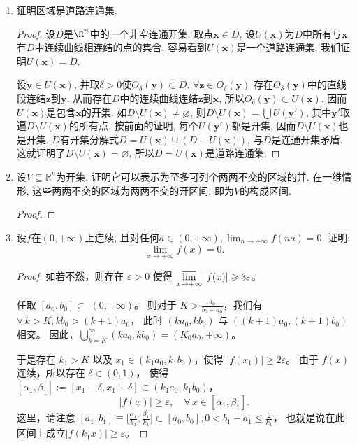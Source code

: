 \begin{3b}
\begin{enumerate}
\item 证明区域是道路连通集.
\begin{proof}
	设\(D\)是\(\R^n\)中的一个非空连通开集. 
    取点\(\boldsymbol{x}\in D\), 设\(U(\boldsymbol{x})\)为\(D\)中所有与\(\boldsymbol{x}\)有\(D\)中连续曲线相连结的点的集合. 
    容易看到\(U(\boldsymbol{x})\)是一个道路连通集. 我们证明\(U(\boldsymbol{x})=D\).
	
	设\(\boldsymbol{y}\in U\left(\boldsymbol{x}\right)\), 
    并取\(\delta>0\)使\(O_{\delta}(\boldsymbol{y})\subset D\). 
    \(\forall\boldsymbol{z}\in O_{\delta}(\boldsymbol{y})\)
    存在\(O_{\delta}(\boldsymbol{y})\)中的直线段连结\(\boldsymbol{z}\)到\(\boldsymbol{y}\), 
    从而存在\(D\)中的连续曲线连结\(\boldsymbol{z}\)到\(\boldsymbol{x}\), 
    所以\(O_{\delta}(\boldsymbol{y})\subset U(\boldsymbol{x})\). 
    因而\(U(\boldsymbol{x})\)是包含\(\boldsymbol{x}\)的开集. 
    如\(D\setminus U(\boldsymbol{x})\ne\varnothing\), 
    则\(D\setminus U(\boldsymbol{x})=\bigcup U(\boldsymbol{y}')\), 
    其中\(\boldsymbol{y}'\)取遍\(D\setminus U(\boldsymbol{x})\)的所有点. 
    按前面的证明, 每个\(U(\boldsymbol{y}')\)都是开集, 
    因而\(D\setminus U(\boldsymbol{x})\)也是开集. 
    \(D\)有开集分解式\(D=U(\boldsymbol{x})\cup \left(D-U(\boldsymbol{x})\right)\), 
    与\(D\)是连通开集矛盾. 这就证明了\(D\setminus U(\boldsymbol{x})=\varnothing\), 
    所以\(D=U(\boldsymbol{x})\)是道路连通集.
\end{proof}
\item 设\(V\subseteq\mathbb{R}^n\)为开集. 证明它可以表示为至多可列个两两不交的区域的并. 
在一维情形, 这些两两不交的区域为两两不交的开区间, 即为\(V\)的构成区间.
\begin{proof}
	
\end{proof}
\item 设\(f\)在\((0,+\infty)\)上连续, 且对任何\(a\in (0,+\infty),\lim_{n\rightarrow+\infty}f(na)=0.\) 证明:\[\lim_{x\rightarrow+\infty}f(x)=0.\]
\begin{proof}
如若不然，则存在 $\varepsilon>0$ 使得 $\varlimsup\limits_{x \rightarrow+\infty}|f(x)| \geqslant 3 \varepsilon$。

任取 $[a_0, b_0] \subset$ $(0,+\infty)$。
则对于 $K>\frac{a_0}{b_0-a_0}$，我们有 $\forall\, k>K, kb_0>(k+1)a_0$，
此时 $(ka_0, kb_0)$ 与 $((k+1)a_0,(k+1)b_0)$ 相交。
因此，$\bigcup\limits_{k=K}^{\infty}(ka_0, kb_0)=(K_0a_0,+\infty)$。

于是存在 $k_1>K$ 以及 $x_1 \in(k_1a_0, k_1b_0)$，使得 $|f(x_1)| \geqslant 2 \varepsilon$。
由于 $f(x)$ 连续，所以存在 $\delta \in(0,1)$，
使得 $[\alpha_1, \beta_1] :=[x_1-\delta, x_1+\delta] \subset(k_1a_0, k_1b_0)$，
$$|f(x)| \geqslant \varepsilon, \quad \forall\, x \in[\alpha_1, \beta_1].$$
这里，请注意 $[a_1, b_1] \equiv\big[\frac{\alpha_1}{k_1}, \frac{\beta_1}{k_1}\big] \subset[a_0, b_0], 0<b_1-a_1 \leqslant \frac{2}{k_1}$，
也就是说在此区间上成立$|f(k_1x)| \geqslant \varepsilon$。


\end{proof}
\end{enumerate}
\end{3b}

